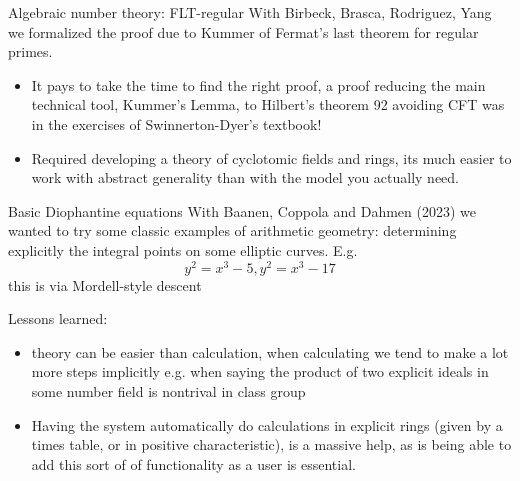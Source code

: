 \documentclass{beamer}
\theoremstyle{plain}
\begin{document}
\begin{frame}{Algebraic number theory: FLT-regular}
    With Birbeck, Brasca, Rodriguez, Yang we formalized the proof due to Kummer of Fermat's last theorem for regular primes.


    \begin{itemize}
        \item It pays to take the time to find the right proof, a proof reducing the main technical tool, Kummer's Lemma, to Hilbert's theorem 92 avoiding CFT was in the exercises of Swinnerton-Dyer's textbook!


        \item<3> Required developing a theory of cyclotomic fields and rings, its much easier to work with abstract generality than with the model you actually need.
    \end{itemize}
\end{frame}

\begin{frame}{Basic Diophantine equations}
    With Baanen, Coppola and Dahmen (2023) we wanted to try some classic examples of arithmetic geometry: determining explicitly the integral points on some elliptic curves. E.g.
    $$y^2 = x^3 - 5, y^2 = x^3 - 17$$
    this is via Mordell-style descent\pause

    Lessons learned:
    \begin{itemize}
        \item
    theory can be easier than calculation, when calculating we tend to make a lot more steps implicitly
    e.g. when saying the product of two explicit ideals in some number field is nontrival in class group\pause
    
        \item
    Having the system automatically do calculations in explicit rings (given by a times table, or in positive characteristic), is a massive help, as is being able to add this sort of of functionality as a user is essential. 
    \end{itemize}
\end{frame}
\end{document}
